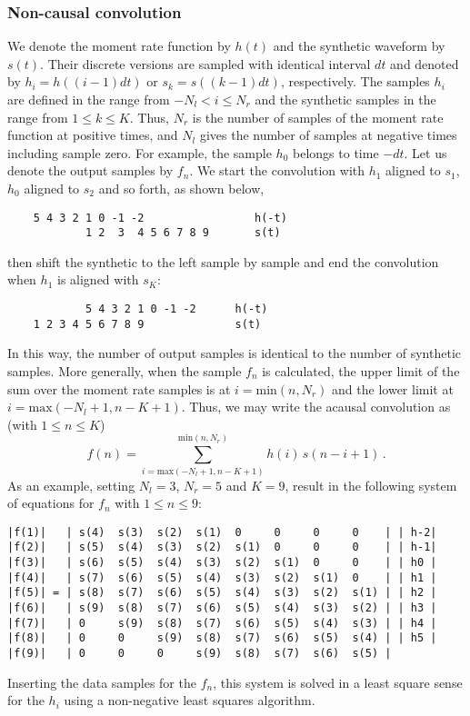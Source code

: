 \subsubsection{Non-causal convolution}
%
We denote the moment rate function by $h(t)$ and the synthetic waveform by $s(t)$. Their discrete versions are sampled with identical interval $dt$ and denoted by $h_i = h((i-1)dt)$ or $s_k = s((k-1)dt)$, respectively. The samples $h_i$ are defined in the range from $-N_l < i \leq N_r$ and the synthetic samples in the range from $1 \leq k \leq K$. Thus, $N_r$ is the number of samples of the moment rate function at positive times, and $N_l$ gives the number of samples at negative times including sample zero. For example, the sample $h_0$ belongs to time $-dt$. Let us denote the output samples by $f_n$. We start the convolution with $h_1$ aligned to $s_1$, $h_0$ aligned to $s_2$ and so forth, as shown below,
\begin{verbatim}
	5 4 3 2 1 0 -1 -2                 h(-t)
	        1 2  3  4 5 6 7 8 9       s(t)
\end{verbatim}
then shift the synthetic to the left sample by sample and end the convolution when $h_1$ is aligned with $s_K$:
\begin{verbatim}
	        5 4 3 2 1 0 -1 -2      h(-t)
	1 2 3 4 5 6 7 8 9              s(t)
\end{verbatim}
In this way, the number of output samples is identical to the number of synthetic samples. More generally, when the sample $f_n$ is calculated, the upper limit of the sum over the moment rate samples is at $i = \mathrm{min}(n,N_r)$ and the lower limit at $i = \mathrm{max}(-N_l+1,n-K+1)$. Thus, we may write the acausal convolution as (with $1 \leq n \leq K$)
%
 \begin{equation}
	f(n) = \sum_{i = \mathrm{max}(-N_l+1,n-K+1)}^{\mathrm{min}(n,N_r)} h(i)\,s(n-i+1) \,. \nonumber
 \end{equation}
%
As an example, setting $N_l = 3$, $N_r = 5$ and $K = 9$, result in the following system of equations for $f_n$ with $1 \leq n \leq 9$:
\begin{verbatim}
|f(1)|   | s(4)  s(3)  s(2)  s(1)  0     0     0     0    | | h-2|
|f(2)|   | s(5)  s(4)  s(3)  s(2)  s(1)  0     0     0    | | h-1|
|f(3)|   | s(6)  s(5)  s(4)  s(3)  s(2)  s(1)  0     0    | | h0 |
|f(4)|   | s(7)  s(6)  s(5)  s(4)  s(3)  s(2)  s(1)  0    | | h1 |
|f(5)| = | s(8)  s(7)  s(6)  s(5)  s(4)  s(3)  s(2)  s(1) | | h2 |
|f(6)|   | s(9)  s(8)  s(7)  s(6)  s(5)  s(4)  s(3)  s(2) | | h3 |
|f(7)|   | 0     s(9)  s(8)  s(7)  s(6)  s(5)  s(4)  s(3) | | h4 |
|f(8)|   | 0     0     s(9)  s(8)  s(7)  s(6)  s(5)  s(4) | | h5 |
|f(9)|   | 0     0     0     s(9)  s(8)  s(7)  s(6)  s(5) |
\end{verbatim}
Inserting the data samples for the $f_n$, this system is solved in a least square sense for the $h_i$ using a non-negative least squares algorithm.
%
